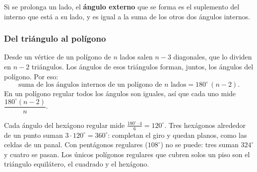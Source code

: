 \documentclass[11pt]{article}
\begin{document}
Si se prolonga un lado, el \textbf{ángulo externo} que se forma es el suplemento del interno
que está a su lado, y es igual a la suma de los otros dos ángulos internos.

\subsubsection*{Del triángulo al polígono}

Desde un vértice de un polígono de $n$ lados salen $n - 3$ diagonales, que lo dividen en
$n - 2$ triángulos. Los ángulos de esos triángulos forman, juntos, los ángulos del polígono. Por
eso:
\[
  \text{suma de los ángulos internos de un polígono de } n \text{ lados} = 180^\circ\,(n - 2).
\]
En un polígono regular todos los ángulos son iguales, así que cada uno mide
$\dfrac{180^\circ (n-2)}{n}$.

\begin{center}
\end{center}

\begin{ejemplo}
Cada ángulo del hexágono regular mide $\frac{180^\circ \cdot 4}{6} = 120^\circ$. Tres hexágonos
alrededor de un punto suman $3 \cdot 120^\circ = 360^\circ$: completan el giro y quedan planos,
como las celdas de un panal. Con pentágonos regulares ($108^\circ$) no se puede: tres suman
$324^\circ$ y cuatro se pasan. Los únicos polígonos regulares que cubren solos un piso son el
triángulo equilátero, el cuadrado y el hexágono.

\begin{center}
\end{center}
\end{ejemplo}
\end{document}
